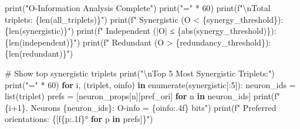 \documentclass[
  11pt,
  letterpaper,
  oneside,
  openany]{book}
\newenvironment{Shaded}{\begin{snugshade}}{\end{snugshade}}
\newcommand{\BuiltInTok}[1]{\textcolor[rgb]{0.00,0.23,0.31}{#1}}
\newcommand{\CharTok}[1]{\textcolor[rgb]{0.13,0.47,0.30}{#1}}
\newcommand{\CommentTok}[1]{\textcolor[rgb]{0.37,0.37,0.37}{#1}}
\newcommand{\ControlFlowTok}[1]{\textcolor[rgb]{0.00,0.23,0.31}{\textbf{#1}}}
\newcommand{\DecValTok}[1]{\textcolor[rgb]{0.68,0.00,0.00}{#1}}
\newcommand{\KeywordTok}[1]{\textcolor[rgb]{0.00,0.23,0.31}{\textbf{#1}}}
\newcommand{\NormalTok}[1]{\textcolor[rgb]{0.00,0.23,0.31}{#1}}
\newcommand{\OperatorTok}[1]{\textcolor[rgb]{0.37,0.37,0.37}{#1}}
\newcommand{\SpecialCharTok}[1]{\textcolor[rgb]{0.37,0.37,0.37}{#1}}
\newcommand{\SpecialStringTok}[1]{\textcolor[rgb]{0.13,0.47,0.30}{#1}}
\newcommand{\StringTok}[1]{\textcolor[rgb]{0.13,0.47,0.30}{#1}}
\begin{document}
\begin{Shaded}
\begin{Highlighting}[]
\BuiltInTok{print}\NormalTok{(}\StringTok{"O{-}Information Analysis Complete"}\NormalTok{)}
\BuiltInTok{print}\NormalTok{(}\StringTok{"="} \OperatorTok{*} \DecValTok{60}\NormalTok{)}
\BuiltInTok{print}\NormalTok{(}\SpecialStringTok{f"}\CharTok{\textbackslash{}n}\SpecialStringTok{Total triplets: }\SpecialCharTok{\{}\BuiltInTok{len}\NormalTok{(all\_triplets)}\SpecialCharTok{\}}\SpecialStringTok{"}\NormalTok{)}
\BuiltInTok{print}\NormalTok{(}\SpecialStringTok{f"  Synergistic (O \textless{} }\SpecialCharTok{\{}\NormalTok{synergy\_threshold}\SpecialCharTok{\}}\SpecialStringTok{): }\SpecialCharTok{\{}\BuiltInTok{len}\NormalTok{(synergistic)}\SpecialCharTok{\}}\SpecialStringTok{"}\NormalTok{)}
\BuiltInTok{print}\NormalTok{(}\SpecialStringTok{f"  Independent (|O| ≤ }\SpecialCharTok{\{}\BuiltInTok{abs}\NormalTok{(synergy\_threshold)}\SpecialCharTok{\}}\SpecialStringTok{): }\SpecialCharTok{\{}\BuiltInTok{len}\NormalTok{(independent)}\SpecialCharTok{\}}\SpecialStringTok{"}\NormalTok{)}
\BuiltInTok{print}\NormalTok{(}\SpecialStringTok{f"  Redundant (O \textgreater{} }\SpecialCharTok{\{}\NormalTok{redundancy\_threshold}\SpecialCharTok{\}}\SpecialStringTok{): }\SpecialCharTok{\{}\BuiltInTok{len}\NormalTok{(redundant)}\SpecialCharTok{\}}\SpecialStringTok{"}\NormalTok{)}

\CommentTok{\# Show top synergistic triplets}
\BuiltInTok{print}\NormalTok{(}\StringTok{"}\CharTok{\textbackslash{}n}\StringTok{Top 5 Most Synergistic Triplets:"}\NormalTok{)}
\BuiltInTok{print}\NormalTok{(}\StringTok{"="} \OperatorTok{*} \DecValTok{60}\NormalTok{)}
\ControlFlowTok{for}\NormalTok{ i, (triplet, oinfo) }\KeywordTok{in} \BuiltInTok{enumerate}\NormalTok{(synergistic[:}\DecValTok{5}\NormalTok{]):}
\NormalTok{    neuron\_ids }\OperatorTok{=} \BuiltInTok{list}\NormalTok{(triplet)}
\NormalTok{    prefs }\OperatorTok{=}\NormalTok{ [neuron\_props[n][}\StringTok{\textquotesingle{}pref\_ori\textquotesingle{}}\NormalTok{] }\ControlFlowTok{for}\NormalTok{ n }\KeywordTok{in}\NormalTok{ neuron\_ids]}
    \BuiltInTok{print}\NormalTok{(}\SpecialStringTok{f"}\SpecialCharTok{\{}\NormalTok{i}\OperatorTok{+}\DecValTok{1}\SpecialCharTok{\}}\SpecialStringTok{. Neurons }\SpecialCharTok{\{}\NormalTok{neuron\_ids}\SpecialCharTok{\}}\SpecialStringTok{: O{-}info = }\SpecialCharTok{\{}\NormalTok{oinfo}\SpecialCharTok{:.4f\}}\SpecialStringTok{ bits"}\NormalTok{)}
    \BuiltInTok{print}\NormalTok{(}\SpecialStringTok{f"   Preferred orientations: }\SpecialCharTok{\{}\NormalTok{[}\SpecialStringTok{f\textquotesingle{}}\SpecialCharTok{\{}\NormalTok{p}\SpecialCharTok{:.1f\}}\SpecialStringTok{°\textquotesingle{}} \ControlFlowTok{for}\NormalTok{ p }\KeywordTok{in}\NormalTok{ prefs]}\SpecialCharTok{\}}\SpecialStringTok{"}\NormalTok{)}


\end{Highlighting}
\end{Shaded}
\end{document}
